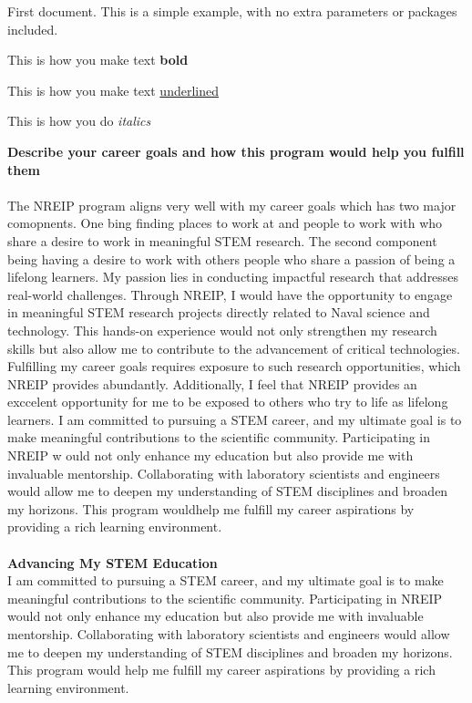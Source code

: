 \documentclass[12pt, letterpaper]{article}
\begin{document}
First document. This is a simple example, with no 
extra parameters or packages included.

This is how you make text \textbf{bold}

This is how you make text \underline{underlined} 

This is how you do \textit{italics}


\noindent \textbf{Describe your career goals and how this program would help you fulfill them}
\\\\
\noindent The NREIP program aligns very well with my career goals 
which has two major comopnents. One bing finding places to work at and people to work with 
who share a desire to work in meaningful STEM research. The second component being having a desire to work 
with others people who share a passion of being a lifelong learners. My passion lies in conducting impactful 
research that addresses real-world challenges. Through NREIP, I would have the opportunity to engage in 
meaningful STEM research projects directly related to Naval science and technology. This hands-on experience 
would not only strengthen my research skills but also allow me to contribute to the advancement of critical 
technologies. Fulfilling my career goals requires exposure to such research opportunities, 
which NREIP provides abundantly. Additionally, I feel that NREIP provides an exccelent opportunity for me to 
be exposed to others who try to life as lifelong learners. I am committed to pursuing a STEM career, and my 
ultimate goal is to make meaningful contributions to the scientific community. Participating in NREIP w
ould not only enhance my education but also provide me with invaluable mentorship. Collaborating with 
laboratory scientists and engineers would allow me to deepen my understanding of STEM disciplines and 
broaden my horizons. This program wouldhelp me fulfill my career aspirations by providing a rich learning
environment.\\\\
\noindent \textbf{Advancing My STEM Education}
\\


\noindent I am committed to pursuing a STEM career, and my ultimate goal is to make meaningful contributions 
to the scientific community. Participating in NREIP would not only enhance my education but also 
provide me with invaluable mentorship. Collaborating with laboratory scientists and engineers would 
allow me to deepen my understanding of STEM disciplines and broaden my horizons. This program would
help me fulfill my career aspirations by providing a rich learning environment.
\end{document}
